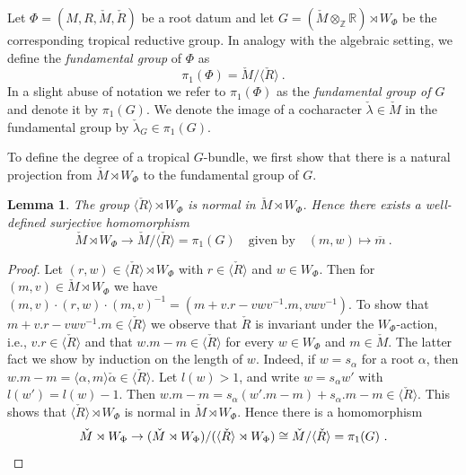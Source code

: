 \documentclass[10pt, a4paper]{amsart}
\newtheorem{lemma}[theorem]{Lemma}
\theoremstyle{definition}
\theoremstyle{myitemstyle}
\newcommand{\ZZ}{\mathbb{Z}}
\newcommand{\RR}{\mathbb{R}}
\newcommand{\Mcheck}{{\check{M}}}
\newcommand{\lambdacheck}{\check{\lambda}}
\newcommand{\Rcheck}{\check{R}}
\newcommand{\alphacheck}{\check{\alpha}}
\begin{document}
Let $\Phi=(M,R,\Mcheck, \Rcheck)$ be a root datum and let $G =  (\Mcheck\otimes_{\ZZ}\RR) \rtimes W_{\Phi}$ be the corresponding tropical reductive group. In analogy with the algebraic setting, we define the \emph{fundamental group} of $\Phi$ as
\[
\pi_1(\Phi)=\Mcheck/\langle \Rcheck\rangle \ . 
\]
In a slight abuse of notation we refer to $\pi_1(\Phi)$ as the \emph{fundamental group of $G$} and denote it by $\pi_1(G)$. We denote the image of a cocharacter $\lambdacheck\in \Mcheck$ in the fundamental group by $\lambdacheck_G\in \pi_1(G)$.




To define the degree of a tropical $G$-bundle, we first show that there is a natural projection from $\Mcheck \rtimes W_\Phi$ to the fundamental group of $G$.

\begin{lemma}
    \label{lem:subgroup is normal}
    The group $\langle \Rcheck\rangle \rtimes W_\Phi$ is normal in $\Mcheck \rtimes W_\Phi$. Hence there exists a well-defined surjective homomorphism 
    \[
    \Mcheck \rtimes W_\Phi \to \Mcheck / \langle \Rcheck \rangle =\pi_1(G)  \quad\text{given by} \quad (m ,w)\mapsto \overline{m}\ .
    \]

\end{lemma}

\begin{proof}
    Let $(r,w) \in \langle \Rcheck\rangle \rtimes W_\Phi$ with $r \in \langle \Rcheck \rangle$ and $w \in W_\Phi$. Then for $(m,v) \in \Mcheck \rtimes W_\Phi$ we have $(m,v)\cdot(r,w)\cdot(m,v)^{-1} = (m+v.r-vwv^{-1}.m, vwv^{-1})$. To show that $m+v.r-vwv^{-1}.m \in \langle \Rcheck \rangle$ we observe that $\Rcheck$ is invariant under the $W_\Phi$-action, i.e., $v.r \in \langle \Rcheck \rangle$ and that $w.m -m  \in \langle \Rcheck \rangle$ for every $w \in W_\Phi$ and $m \in \Mcheck$. The latter fact we show by induction on the length of $w$. Indeed, if $w = s_\alpha$ for a root $\alpha$, then $w.m-m = \langle \alpha,m \rangle \alphacheck \in \langle \Rcheck \rangle$. Let $l(w) > 1$, and write $w = s_\alpha w'$ with $l(w') = l(w)-1$. Then $w.m-m = s_\alpha(w'.m-m) + s_\alpha.m-m \in \langle \Rcheck \rangle.$ This shows that $\langle \Rcheck\rangle \rtimes W_\Phi$ is normal in $\Mcheck \rtimes W_\Phi$.
    Hence there is a homomorphism 
    \[
    \Mcheck \rtimes W_\Phi \to (\Mcheck \rtimes W_\Phi) / (\langle \Rcheck \rangle \rtimes W_\Phi) \cong   \Mcheck / \langle \Rcheck \rangle =\pi_1(G)\ . \qedhere
    \]
\end{proof}
\end{document}
